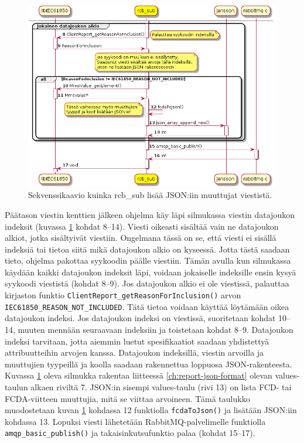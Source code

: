 \begin{figure}[ht!]
	\includegraphics[width=1\textwidth]{pictures/rcb-sub-report-to-json_001.png}
	\caption{Sekvenssikaavio kuinka rcb\_sub lisää JSON:iin muuttujat viestistä.}
	\label{fig:rcb-sub-report-to-json-2}
\end{figure}

Päätason viestin kenttien jälkeen ohjelma käy läpi silmukassa viestin datajoukon indeksit (kuvassa \ref{fig:rcb-sub-report-to-json-2} kohdat 8--14). Viesti oikeasti sisältää vain ne datajoukon alkiot, jotka sisältyivät viestiin. Ongelmana tässä on se, että viesti ei sisällä indeksiä tai tietoa siitä mikä datajoukon alkio on kyseessä. Jotta tästä saadaan tieto, ohjelma pakottaa syykoodin päälle viestiin. Tämän avulla kun silmukassa käydään kaikki datajoukon indeksit läpi, voidaan jokaiselle indeksille ensin kysyä syykoodi viestistä (kohdat 8--9). Jos datajoukon alkio ei ole viestissä, palauttaa kirjaston funktio \texttt{Cli\-entRe\-port\-\_\-get\-Rea\-son\-For\-Inc\-lu\-si\-on\-()} arvon \texttt{IEC61850\_REASON\_NOT\_INCLUDED}. Tätä tietoa voidaan käyttää löytämään oikea datajoukon indeksi. Jos datajoukon indeksi on viestissä, suoritetaan kohdat 10--14, muuten mennään seuraavaan indeksiin ja toistetaan kohdat 8--9. Datajoukon indeksi tarvitaan, jotta aiemmin luetut spesifikaatiot saadaan yhdistettyä attribuutteihin arvojen kanssa. Datajoukon indeksillä, viestin arvoilla ja muuttujien tyypeillä ja koolla saadaan rakennettua loppuosa JSON-rakenteesta. Kuvassa \ref{fig:rcb-sub-report-to-json-2} oleva silmukka rakentaa liitteessä \ref{ch:report-json-format} olevan values-taulun alkaen riviltä 7. JSON:in sisempi values-taulu (rivi 13) on lista FCD- tai FCDA-viitteen muuttujia, mitä se viittaa arvoineen. Tämä taulukko muodostetaan kuvan \ref{fig:rcb-sub-report-to-json-2} kohdassa 12 funktiolla \texttt{fcdaToJson()} ja lisätään JSON:iin kohdassa 13. Lopuksi viesti lähetetään RabbitMQ-palvelimelle funktiolla \texttt{amqp\_basic\_publish()} ja takaisinkutsufunktio palaa (kohdat 15--17).